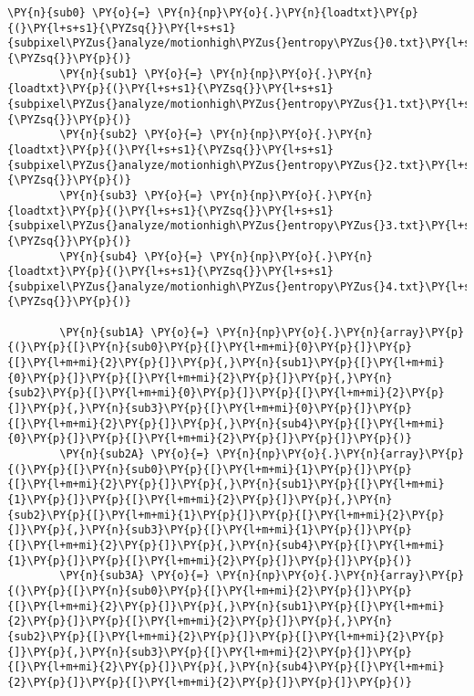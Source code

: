 {\begin{enumerate}
\begin{Verbatim}[commandchars=\\\{\}]
        \PY{n}{sub0} \PY{o}{=} \PY{n}{np}\PY{o}{.}\PY{n}{loadtxt}\PY{p}{(}\PY{l+s+s1}{\PYZsq{}}\PY{l+s+s1}{subpixel\PYZus{}analyze/motionhigh\PYZus{}entropy\PYZus{}0.txt}\PY{l+s+s1}{\PYZsq{}}\PY{p}{)}
        \PY{n}{sub1} \PY{o}{=} \PY{n}{np}\PY{o}{.}\PY{n}{loadtxt}\PY{p}{(}\PY{l+s+s1}{\PYZsq{}}\PY{l+s+s1}{subpixel\PYZus{}analyze/motionhigh\PYZus{}entropy\PYZus{}1.txt}\PY{l+s+s1}{\PYZsq{}}\PY{p}{)}
        \PY{n}{sub2} \PY{o}{=} \PY{n}{np}\PY{o}{.}\PY{n}{loadtxt}\PY{p}{(}\PY{l+s+s1}{\PYZsq{}}\PY{l+s+s1}{subpixel\PYZus{}analyze/motionhigh\PYZus{}entropy\PYZus{}2.txt}\PY{l+s+s1}{\PYZsq{}}\PY{p}{)}
        \PY{n}{sub3} \PY{o}{=} \PY{n}{np}\PY{o}{.}\PY{n}{loadtxt}\PY{p}{(}\PY{l+s+s1}{\PYZsq{}}\PY{l+s+s1}{subpixel\PYZus{}analyze/motionhigh\PYZus{}entropy\PYZus{}3.txt}\PY{l+s+s1}{\PYZsq{}}\PY{p}{)}
        \PY{n}{sub4} \PY{o}{=} \PY{n}{np}\PY{o}{.}\PY{n}{loadtxt}\PY{p}{(}\PY{l+s+s1}{\PYZsq{}}\PY{l+s+s1}{subpixel\PYZus{}analyze/motionhigh\PYZus{}entropy\PYZus{}4.txt}\PY{l+s+s1}{\PYZsq{}}\PY{p}{)}
        
        \PY{n}{sub1A} \PY{o}{=} \PY{n}{np}\PY{o}{.}\PY{n}{array}\PY{p}{(}\PY{p}{[}\PY{n}{sub0}\PY{p}{[}\PY{l+m+mi}{0}\PY{p}{]}\PY{p}{[}\PY{l+m+mi}{2}\PY{p}{]}\PY{p}{,}\PY{n}{sub1}\PY{p}{[}\PY{l+m+mi}{0}\PY{p}{]}\PY{p}{[}\PY{l+m+mi}{2}\PY{p}{]}\PY{p}{,}\PY{n}{sub2}\PY{p}{[}\PY{l+m+mi}{0}\PY{p}{]}\PY{p}{[}\PY{l+m+mi}{2}\PY{p}{]}\PY{p}{,}\PY{n}{sub3}\PY{p}{[}\PY{l+m+mi}{0}\PY{p}{]}\PY{p}{[}\PY{l+m+mi}{2}\PY{p}{]}\PY{p}{,}\PY{n}{sub4}\PY{p}{[}\PY{l+m+mi}{0}\PY{p}{]}\PY{p}{[}\PY{l+m+mi}{2}\PY{p}{]}\PY{p}{]}\PY{p}{)}
        \PY{n}{sub2A} \PY{o}{=} \PY{n}{np}\PY{o}{.}\PY{n}{array}\PY{p}{(}\PY{p}{[}\PY{n}{sub0}\PY{p}{[}\PY{l+m+mi}{1}\PY{p}{]}\PY{p}{[}\PY{l+m+mi}{2}\PY{p}{]}\PY{p}{,}\PY{n}{sub1}\PY{p}{[}\PY{l+m+mi}{1}\PY{p}{]}\PY{p}{[}\PY{l+m+mi}{2}\PY{p}{]}\PY{p}{,}\PY{n}{sub2}\PY{p}{[}\PY{l+m+mi}{1}\PY{p}{]}\PY{p}{[}\PY{l+m+mi}{2}\PY{p}{]}\PY{p}{,}\PY{n}{sub3}\PY{p}{[}\PY{l+m+mi}{1}\PY{p}{]}\PY{p}{[}\PY{l+m+mi}{2}\PY{p}{]}\PY{p}{,}\PY{n}{sub4}\PY{p}{[}\PY{l+m+mi}{1}\PY{p}{]}\PY{p}{[}\PY{l+m+mi}{2}\PY{p}{]}\PY{p}{]}\PY{p}{)}
        \PY{n}{sub3A} \PY{o}{=} \PY{n}{np}\PY{o}{.}\PY{n}{array}\PY{p}{(}\PY{p}{[}\PY{n}{sub0}\PY{p}{[}\PY{l+m+mi}{2}\PY{p}{]}\PY{p}{[}\PY{l+m+mi}{2}\PY{p}{]}\PY{p}{,}\PY{n}{sub1}\PY{p}{[}\PY{l+m+mi}{2}\PY{p}{]}\PY{p}{[}\PY{l+m+mi}{2}\PY{p}{]}\PY{p}{,}\PY{n}{sub2}\PY{p}{[}\PY{l+m+mi}{2}\PY{p}{]}\PY{p}{[}\PY{l+m+mi}{2}\PY{p}{]}\PY{p}{,}\PY{n}{sub3}\PY{p}{[}\PY{l+m+mi}{2}\PY{p}{]}\PY{p}{[}\PY{l+m+mi}{2}\PY{p}{]}\PY{p}{,}\PY{n}{sub4}\PY{p}{[}\PY{l+m+mi}{2}\PY{p}{]}\PY{p}{[}\PY{l+m+mi}{2}\PY{p}{]}\PY{p}{]}\PY{p}{)}
        

\end{Verbatim}
\end{enumerate}}
